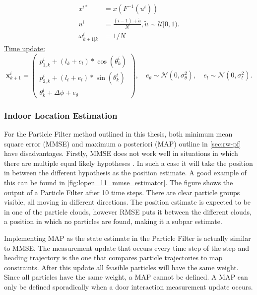\begin{algorithm}[]
{\begin{subequations}
{				\begin{align}
					x^{i*} &= x(F^{-1}(u^i)) \\
					u^i &= \frac{(i-1) + \tilde{u}}{N}, \tilde{u} \sim \mathcal{U}[0,1).\\
					\omega^i_{k+1|k} &= 1/N
				\end{align}
				
				\label{eq:pf_resampling}	
		}	\end{subequations}\smallskip
		\underline{Time update:}\\
		\begin{equation}
			\label{eq:algo_SHS_dynamic_model_with_noise}
			\mathbf{x}^i_{k + 1}
			=
			\left(\begin{array}{l}
				p_{1,k}^i + (l_{k} + e_l) * \cos (\theta_{k}^i) \\
				p_{2,k}^i + (l_{t} + e_l) * \sin (\theta_{k}^i) \\
				\theta_{k}^i + \Delta \phi + e_\theta 
			\end{array}\right), \quad
			e_{\theta} \sim \mathcal{N}\left(0, \sigma_{\theta}^{2}\right), \quad e_{l} \sim \mathcal{N}\left(0, \sigma_{l}^{2}\right).
		\end{equation}		
	}
\end{algorithm}
\restoregeometry
\newpage
\subsubsection{Indoor Location Estimation}
For the Particle Filter method outlined in this thesis, both minimum mean square error (MMSE) and maximum a posteriori (MAP) outline in \cref{sec:rw-pf} have disadvantages.
Firstly, MMSE does not work well in situations in which there are multiple equal likely hypotheses \cite{Saha2009}. In such a case it will take the position in between the different hypothesis as the position estimate. A good example of this can be found in \cref{fig:lopen_11_mmse_estimator}. The figure shows the output of a Particle Filter after 10 time steps. There are clear particle groups visible, all moving in different directions. The position estimate is expected to be in one of the particle clouds, however RMSE puts it between the different clouds, a position in which no particles are found, making it a subpar estimate. \par 
Implementing MAP as the state estimate in the Particle Filter is actually similar to MMSE. The measurement update that occurs every time step of the step and heading trajectory is the one that compares particle trajectories to map constraints. After this update all feasible particles will have the same weight. Since all particles have the same weight, a MAP cannot be defined. A MAP can only be defined sporadically when a door interaction measurement update occurs. 

